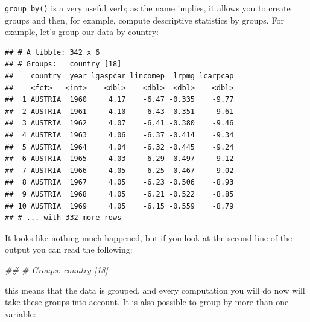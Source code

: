 \documentclass[]{gitbook}
\newenvironment{Shaded}{\begin{snugshade}}{\end{snugshade}}
\newcommand{\CommentTok}[1]{\textcolor[rgb]{0.56,0.35,0.01}{\textit{#1}}}
\newcommand{\KeywordTok}[1]{\textcolor[rgb]{0.13,0.29,0.53}{\textbf{#1}}}
\newcommand{\NormalTok}[1]{#1}
\newcommand{\OperatorTok}[1]{\textcolor[rgb]{0.81,0.36,0.00}{\textbf{#1}}}
\newcommand{\StringTok}[1]{\textcolor[rgb]{0.31,0.60,0.02}{#1}}
\begin{document}
\texttt{group\_by()} is a very useful verb; as the name implies, it allows you to create groups and then,
for example, compute descriptive statistics by groups. For example, let's group our data by
country:

\begin{Shaded}
\end{Shaded}

\begin{verbatim}
## # A tibble: 342 x 6
## # Groups:   country [18]
##    country  year lgaspcar lincomep  lrpmg lcarpcap
##    <fct>   <int>    <dbl>    <dbl>  <dbl>    <dbl>
##  1 AUSTRIA  1960     4.17    -6.47 -0.335    -9.77
##  2 AUSTRIA  1961     4.10    -6.43 -0.351    -9.61
##  3 AUSTRIA  1962     4.07    -6.41 -0.380    -9.46
##  4 AUSTRIA  1963     4.06    -6.37 -0.414    -9.34
##  5 AUSTRIA  1964     4.04    -6.32 -0.445    -9.24
##  6 AUSTRIA  1965     4.03    -6.29 -0.497    -9.12
##  7 AUSTRIA  1966     4.05    -6.25 -0.467    -9.02
##  8 AUSTRIA  1967     4.05    -6.23 -0.506    -8.93
##  9 AUSTRIA  1968     4.05    -6.21 -0.522    -8.85
## 10 AUSTRIA  1969     4.05    -6.15 -0.559    -8.79
## # ... with 332 more rows
\end{verbatim}

It looks like nothing much happened, but if you look at the second line of the output you can read
the following:

\begin{Shaded}
\begin{Highlighting}[]
\CommentTok{## # Groups:   country [18]}
\end{Highlighting}
\end{Shaded}

this means that the data is grouped, and every computation you will do now will take these groups
into account. It is also possible to group by more than one variable:

\begin{Shaded}
\end{Shaded}
\end{document}
